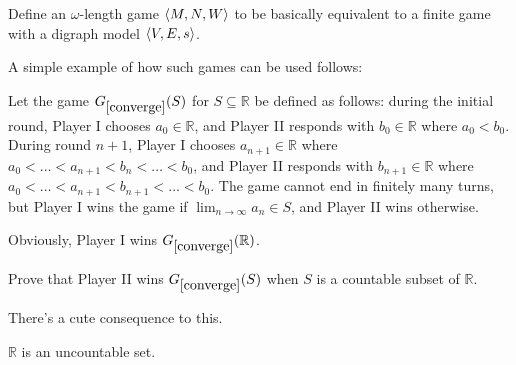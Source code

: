 \begin{question}
Define an $\omega$-length game $\langle M,N,W\rangle$ to be basically equivalent to a finite game with a digraph model $\langle V,E,s\rangle$.
\end{question}

A simple example of how such games can be used follows:

\begin{game}\label{converge}
Let the game $G_{\ref{converge}}(S)$ for $S\subseteq \mathbb{R}$ be defined as follows: during the initial round, Player I chooses $a_0\in \mathbb{R}$, and Player II responds with $b_0\in \mathbb{R}$ where $a_0<b_0$. During round $n+1$, Player I chooses $a_{n+1}\in \mathbb{R}$ where $a_0<\dots<a_{n+1}<b_n<\dots<b_0$, and Player II responds with $b_{n+1}\in \mathbb{R}$ where $a_0<\dots<a_{n+1}<b_{n+1}<\dots<b_0$. The game cannot end in finitely many turns, but Player I wins the game if $\lim_{n\to\infty} a_n \in S$, and Player II wins otherwise.
\end{game}

Obviously, Player I wins $G_{\ref{converge}}(\mathbb{R})$.

\begin{question}
Prove that Player II wins $G_{\ref{converge}}(S)$ when $S$ is a countable subset of $\mathbb{R}$.
\end{question}

There's a cute consequence to this.

\begin{theorem}
$\mathbb{R}$ is an uncountable set.
\end{theorem}




